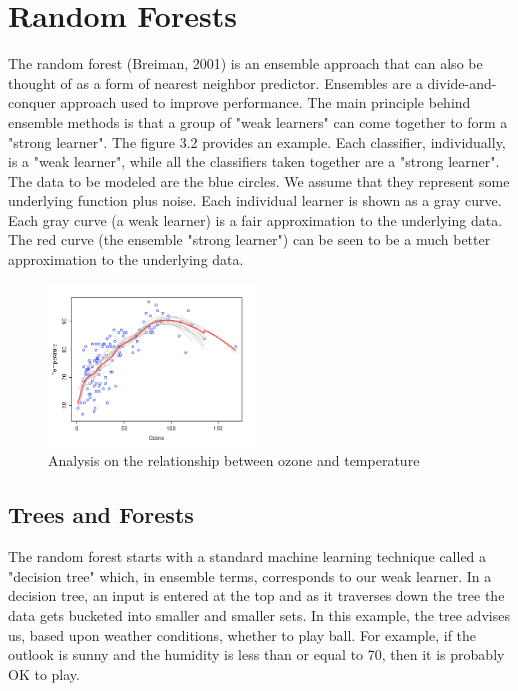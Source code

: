 \section{Random Forests}

The random forest (Breiman, 2001) is an ensemble approach that can also be thought of as a form of nearest neighbor predictor.
Ensembles are a divide-and-conquer approach used to improve performance. The main principle behind ensemble methods is that a group of "weak learners" can come together to form a "strong learner". The figure 3.2 provides an example. Each classifier, individually, is a "weak learner", while all the classifiers taken together are a "strong learner".
The data to be modeled are the blue circles. We assume that they represent some underlying function plus noise. Each individual learner is shown as a gray curve. Each gray curve (a weak learner) is a fair approximation to the underlying data. The red curve (the ensemble "strong learner") can be seen to be a much better approximation to the underlying data.

\begin{figure}
\centering
\includegraphics[width=0.5\textwidth]{img/rf_1.png}
\caption{Analysis on the relationship between ozone and temperature}
\label{}
\end{figure}

\subsection*{Trees and Forests}
The random forest starts with a standard machine learning technique called a "decision tree" which, in ensemble terms, corresponds to our weak learner. In a decision tree, an input is entered at the top and as it traverses down the tree the data gets bucketed into smaller and smaller sets.
In this example, the tree advises us, based upon weather conditions, whether to play ball. For example, if the outlook is sunny and the humidity is less than or equal to 70, then it is probably OK to play.

